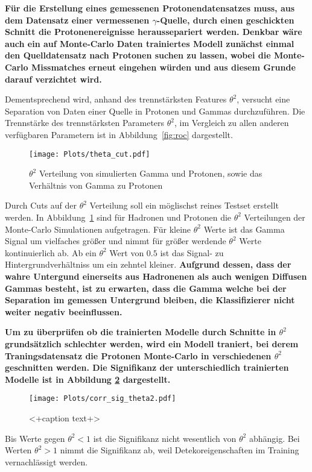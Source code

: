 \textbf{Für die Erstellung eines gemessenen Protonendatensatzes muss, aus dem Datensatz einer vermessenen $\gamma$-Quelle, durch einen geschickten Schnitt die Protonenereignisse heraussepariert werden. 
Denkbar wäre auch ein auf Monte-Carlo Daten trainiertes Modell zunächst einmal den Quelldatensatz nach Protonen suchen zu lassen, wobei die Monte-Carlo Missmatches erneut eingehen würden und aus diesem Grunde darauf verzichtet wird.}

Dementsprechend wird, anhand des trennstärksten Features $\theta^{2}$, versucht eine Separation von Daten einer Quelle in Protonen und Gammas durchzuführen. 
Die Trennstärke des trennstärksten Parameters $\theta^{2}$, im Vergleich zu allen anderen verfügbaren Parametern ist in Abbildung~\ref{fig:roc} dargestellt. 
\begin{figure}[H]
  \centering
  \texttt{[image: Plots/theta\_cut.pdf]}
  \caption{$\theta^{2}$ Verteilung von simulierten Gamma und Protonen, sowie das Verhältnis von Gamma zu Protonen}
  \label{fig:thetacut}
\end{figure}
Durch Cuts auf der $\theta^{2}$ Verteilung soll ein möglischst reines Testset erstellt werden. 
In Abbildung~\ref{fig:thetacut} sind für Hadronen und Protonen die $\theta^{2}$ Verteilungen der Monte-Carlo Simulationen aufgetragen. 
Für kleine $\theta^{2}$ Werte ist das Gamma Signal um vielfaches größer und nimmt für größer werdende $\theta^{2}$ Werte kontinuierlich ab. 
Ab ein $\theta^{2}$ Wert von $0.5$ ist das Signal- zu Hintergrundverhältniss um ein zehntel kleiner.
\textbf{Aufgrund dessen, dass der wahre Untergund einerseits aus Hadronenen als auch wenigen Diffusen Gammas besteht, ist zu erwarten, dass die Gamma welche bei der Separation im gemessen Untergrund bleiben, die Klassifizierer nicht weiter negativ beeinflussen.}

\textbf{Um zu überprüfen ob die trainierten Modelle durch Schnitte in $\theta^{2}$ grundsätzlich schlechter werden, wird ein Modell traniert, bei derem Traningsdatensatz die Protonen Monte-Carlo in verschiedenen $\theta^{2}$ geschnitten werden. 
Die Signifikanz der unterschiedlich trainierten Modelle ist in Abbildung \ref{fig:corrtheta} dargestellt.}
\begin{figure}[H]
  \centering
  \texttt{[image: Plots/corr\_sig\_theta2.pdf]}
  \caption{<+caption text+>}
  \label{fig:corrtheta}
\end{figure}
Bis Werte gegen $\theta^{2} < 1$ ist die Signifikanz nicht wesentlich von $\theta^{2}$ abhängig. 
Bei Werten $\theta^{2} > 1$ nimmt die Signifikanz ab, weil Detekoreigenschaften im Training vernachlässigt werden.

